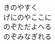 \documentclass[10pt,b5j]{tarticle} %
\begin{document}
\begin{enumerate}
\begin{minipage}[c]{\blocksize}
        \vspace{\linespace}
        \item
        きのやすく\\
        げにのやここに\\
        のぞただよへる\\
        のぞみなぎれる
    
    \end{minipage}
\end{enumerate} %
\end{document}
